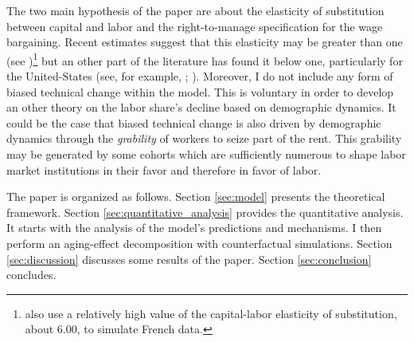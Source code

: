 

The two main hypothesis of the paper are about the elasticity of substitution between capital and labor and the right-to-manage specification for the wage bargaining. Recent estimates suggest that this elasticity may be greater than one (see \citealt{Karabarbounis2014})\footnote{\cite{Caballero1998} also use a relatively high value of the capital-labor elasticity of substitution, about 6.00, to simulate French data.} but an other part of the literature has found it below one, particularly for the United-States (see, for example, \citealt{Antras2004}; \citealt{Chirinko2008}). 
Moreover, I do not include any form of biased technical change within the model. This is voluntary in order to develop an other theory on the labor share's decline based on demographic dynamics. It could be the case that biased technical change is also driven by demographic dynamics through the \textit{grability} of workers to seize part of the rent. This grability may be generated by some cohorts which are sufficiently numerous to shape labor market institutions in their favor and therefore in favor of labor.


The paper is organized as follows. Section \ref{sec:model} presents the theoretical framework. Section \ref{sec:quantitative_analysis} provides the quantitative analysis. It starts with the analysis of the model's predictions and mechanisms. I then perform an aging-effect decomposition with counterfactual simulations. Section \ref{sec:discussion} discusses some results of the paper. Section \ref{sec:conclusion} concludes.